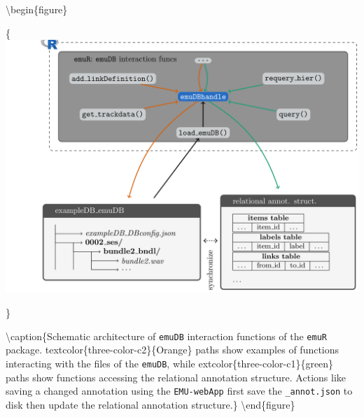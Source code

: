 \documentclass[]{book}
\theoremstyle{definition}
\theoremstyle{definition}
\theoremstyle{definition}
\theoremstyle{remark}
\begin{document}
\textbackslash{}begin\{figure\}

\{\centering \includegraphics[width=0.75\linewidth]{pics/emuRstruct}

\}

\textbackslash{}caption\{Schematic architecture of \texttt{emuDB}
interaction functions of the \texttt{emuR} package.
textcolor\{three-color-c2\}\{Orange\} paths show examples of functions
interacting with the files of the \texttt{emuDB}, while
extcolor\{three-color-c1\}\{green\} paths show functions accessing the
relational annotation structure. Actions like saving a changed
annotation using the \texttt{EMU-webApp} first save the
\texttt{\_annot.json} to disk then update the relational annotation
structure.\}\label{fig:query-schematic-emuR-structure}
\textbackslash{}end\{figure\}


\end{document}
